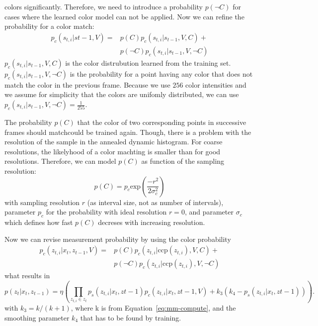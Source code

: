 \documentclass[twoside,a4paper,article]{combine}
\begin{document}
colors significantly. Therefore, we need to introduce a probability
$p(\neg C)$ for cases where the learned color model can not be
applied. Now we can refine the probability for a color match:
\begin{align}
p_c(s_{t,i}|s{t-1},V)
  = &p(C)p_c(s_{t,i}|s_{t-1},V,C)+ \nonumber\\
&p(\neg C)p_c(s_{t,i}|s_{t-1},V,\neg C)\nonumber
\end{align}
$p_c(s_{t,i}|s_{t-1},V,C)$ is the color distrubution learned from the
training set. $p_c(s_{t,i}|s_{t-1},V,\neg C)$ is the probability for a
point having any color that does not match the color in the previous
frame. Because we use $256$ color intensities and we assume for
simplicity that the colors are unifomly distributed, we can use
$p_c(s_{t,i}|s_{t-1},V,\neg C) = \frac{1}{255}$.

The probability $p(C)$ that the color of two corresponding points in
successive frames should matchcould be trained again. Though, there is
a problem with the resolution of the sample in the annealed dynamic
histogram. For coarse resolutions, the likelyhood of a color
machting is smaller than for good resolutions. Therefore, we can model
$p(C)$ as function of the sampling resolution:
\begin{equation}
  p(C) = p_c \mathrm{exp}\left( \frac{-r^2}{2\sigma_c^2} \right)
\end{equation}
with sampling resolution $r$ (as interval size, not as number of
intervals), parameter $p_c$ for the probability with ideal resolution
$r=0$, and parameter $\sigma_c$ which defines how fast $p(C)$ decreses
with increasing resolution.

Now we can revise measurement probability by
using the color probability
\begin{align}
  p_c(z_{t,i}|x_t,z_{t-1},V) 
  = &p(C)p_c(z_{t,i}|\mathrm{ccp}(z_{t,i}),V,C)+\nonumber\\
  &p(\neg C)p_c(z_{t,i}|\mathrm{ccp}(z_{t,i}),V,\neg C)
\end{align}
what results in
\begin{equation}
\label{eq:mm-color-compute}
p(z_t|x_t,z_{t-1}) = \eta\left(\prod_{z_{t,i}\in z_t}
p_s(z_{t,i}|x_t,z{t-1})p_c(z_{t,i}|x_t,z{t-1},V)
+ k_3(k_4 - p_s(z_{t,i}|x_t,z{t-1}))
\right)
\mathrm{ . }
\end{equation}
with $k_3=k/(k+1)$, where k is from Equation~\ref{eq:mm-compute}, and
the smoothing parameter $k_4$ that has to be found by training.
\end{document}
